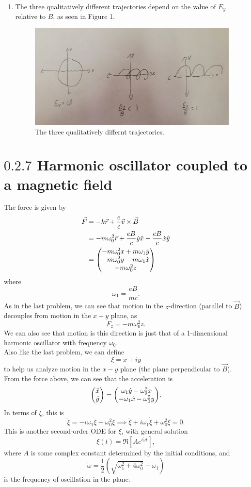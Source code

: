 \documentclass[12pt]{article}
\begin{document}
\begin{enumerate}[label=(\alph*)]
    \item The three qualitatively different trajectories depend on the value of $E_y$ relative to $B$, as seen in Figure 1.
    \begin{figure}[H]
        \includegraphics[scale=0.25]{fig1}
        \centering
        \caption{The three qualitatively differnt trajectories.}
        \label{fig1}
    \end{figure}
\end{enumerate}


\section*{$0.2.7$ Harmonic oscillator coupled to a magnetic field}
The force is given by
\begin{align*}
    \vec{F} &= -k\vec{r} + \frac{e}{c}\vec{v}\times\vec{B} \\
    &= -m\omega_0^2\vec{r} + \frac{eB}{c}\dot{y}\hat{x} + \frac{eB}{c}\dot{x}\hat{y} \\
    &= \mqty(-m\omega_0^2 x + m\omega_1\dot{y} \\ -m\omega_0^2y - m\omega_1\dot{x} \\ -m\omega_0^2z)
\end{align*}
where 
\[ \omega_1 = \frac{eB}{mc}. \]
As in the last problem, we can see that motion in the $z$-direction (parallel to $\vec{B}$) decouples from motion in the $x-y$ plane, as
\[ F_z = -m\omega_0^2 z. \]
We can also see that motion is this direction is just that of a 1-dimensional harmonic oscillator with frequency $\omega_0$. \\
Also like the last problem, we can define
\[ \xi = x + iy \]
to help us analyze motion in the $x-y$ plane (the plane perpendicular to $\vec{B}$). From the force above, we can see that the acceleration is
\[ \mqty(\ddot{x} \\ \ddot{y}) = \mqty(\omega_1\dot{y} - \omega_0^2x \\ -\omega_1\dot{x} - \omega_0^2y). \]
In terms of $\xi$, this is 
\[ \ddot{\xi} = -i\omega_1\dot{\xi} - \omega_0^2\xi \implies \ddot{\xi} + i\omega_1\dot{\xi} + \omega_0^2\xi = 0. \]
This is another second-order ODE for $\xi$, with general solution 
\[ \xi(t) = \Re[Ae^{i\tilde{\omega}t}], \]
where $A$ is some complex constant determined by the initial conditions, and
\[ \tilde{\omega} = \frac{1}{2}\left(\sqrt{\omega_1^2 + 4\omega_0^2} - \omega_1\right) \]
is the frequency of oscillation in the plane.
\end{document}
